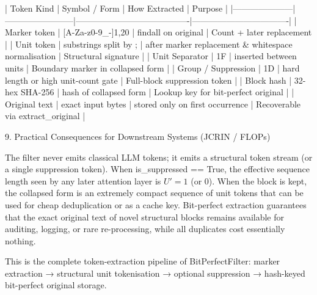 | Token Kind          | Symbol / Form          | How Extracted                          | Purpose                          |
|---------------------|------------------------|----------------------------------------|----------------------------------|
| Marker token        | [A-Za-z0-9_-]{1,20} | findall on original                  | Count + later replacement        |
| Unit token          | substrings split by { } ; \n | after marker replacement & whitespace normalisation | Structural signature             |
| Unit Separator      | \x1F                 | inserted between units                 | Boundary marker in collapsed form |
| Group / Suppression | \x1D                 | hard length or high unit-count gate    | Full-block suppression token     |
| Block hash          | 32-hex SHA-256         | hash of collapsed form                 | Lookup key for bit-perfect original |
| Original text       | exact input bytes      | stored only on first occurrence        | Recoverable via extract_original |

9. Practical Consequences for Downstream Systems (JCRIN / FLOPs)

The filter never emits classical LLM tokens; it emits a structural token stream (or a single suppression token).
When is_suppressed == True, the effective sequence length seen by any later attention layer is \( U' = 1 \) (or 0).
When the block is kept, the collapsed form is an extremely compact sequence of unit tokens that can be used for cheap deduplication or as a cache key.
Bit-perfect extraction guarantees that the exact original text of novel structural blocks remains available for auditing, logging, or rare re-processing, while all duplicates cost essentially nothing.

This is the complete token-extraction pipeline of BitPerfectFilter:  
marker extraction → structural unit tokenisation → optional suppression → hash-keyed bit-perfect original storage.
